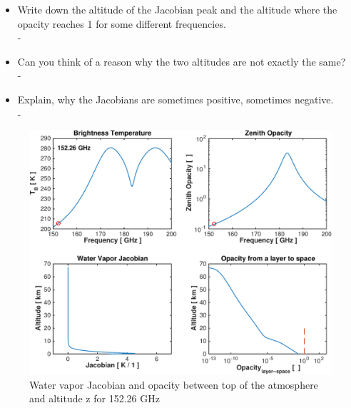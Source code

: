 \documentclass[paper=a4, fontsize=11pt]{scrartcl} %
\numberwithin{figure}{section}
\begin{document}
\begin{itemize}
	\item Write down the altitude of the Jacobian peak and the altitude where the opacity reaches 1 for some different frequencies. \ \\ -
	
	\item Can you think of a reason why the two altitudes are not exactly the same? \ \\ -
	
	\item Explain, why the Jacobians are sometimes positive, sometimes negative. \ \\ -
\end{itemize}

\begin{figure}[h]
\centering
	\includegraphics[width=\textwidth]{plots/jac_152GHz.pdf}
	\caption{Water vapor Jacobian and opacity between top of the atmosphere and altitude z for 152.26 GHz}
\end{figure}
\end{document}
